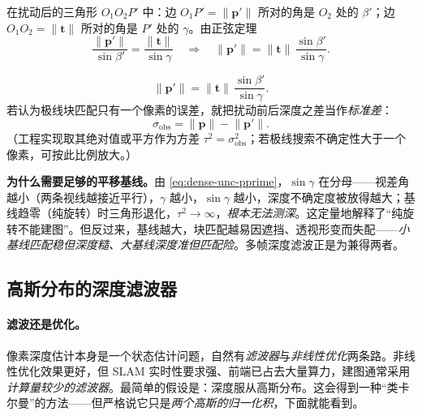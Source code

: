 \begin{derivation}
在扰动后的三角形 $O_1O_2P'$ 中：边 $O_1P'=\|\mathbf{p}'\|$ 所对的角是 $O_2$ 处的 $\beta'$；边 $O_1O_2=\|\mathbf{t}\|$ 所对的角是 $P'$ 处的 $\gamma$。由正弦定理
\[
  \frac{\|\mathbf{p}'\|}{\sin\beta'}=\frac{\|\mathbf{t}\|}{\sin\gamma}
  \quad\Longrightarrow\quad
  \|\mathbf{p}'\|=\|\mathbf{t}\|\,\frac{\sin\beta'}{\sin\gamma}.
\]
\end{derivation}

\begin{equation}
  \|\mathbf{p}'\|=\|\mathbf{t}\|\,\frac{\sin\beta'}{\sin\gamma}.
  \label{eq:dense-unc-pprime}
\end{equation}
若认为极线块匹配只有一个像素的误差，就把扰动前后深度之差当作\emph{标准差}：
\begin{equation}
  \sigma_{\mathrm{obs}}=\bigl\|\mathbf{p}\bigr\|-\bigl\|\mathbf{p}'\bigr\|.
  \label{eq:dense-unc-sigma}
\end{equation}
（工程实现取其绝对值或平方作为方差 $\tau^2=\sigma_{\mathrm{obs}}^2$；若极线搜索不确定性大于一个像素，可按此比例放大。）

\begin{insight}
\textbf{为什么需要足够的平移基线。}由 \cref{eq:dense-unc-pprime}，$\sin\gamma$ 在分母——视差角越小（两条视线越接近平行），$\gamma$ 越小，$\sin\gamma$ 越小，深度不确定度被放得越大；基线趋零（纯旋转）时三角形退化，$\tau^2\to\infty$，\emph{根本无法测深}。这定量地解释了“纯旋转不能建图”。但反过来，基线越大，块匹配越易因遮挡、透视形变而失配——\emph{小基线匹配稳但深度糙、大基线深度准但匹配险}。多帧深度滤波正是为兼得两者。
\end{insight}

\subsection{高斯分布的深度滤波器}
\label{sec:dense-depth-filter}

\paragraph{滤波还是优化。}
像素深度估计本身是一个状态估计问题，自然有\emph{滤波器}与\emph{非线性优化}两条路。非线性优化效果更好，但 SLAM 实时性要求强、前端已占去大量算力，建图通常采用\emph{计算量较少的滤波器}\cite{gaoxiang2019slam14}。最简单的假设是：深度服从高斯分布。这会得到一种“类卡尔曼”的方法——但严格说它只是\emph{两个高斯的归一化积}，下面就能看到。

